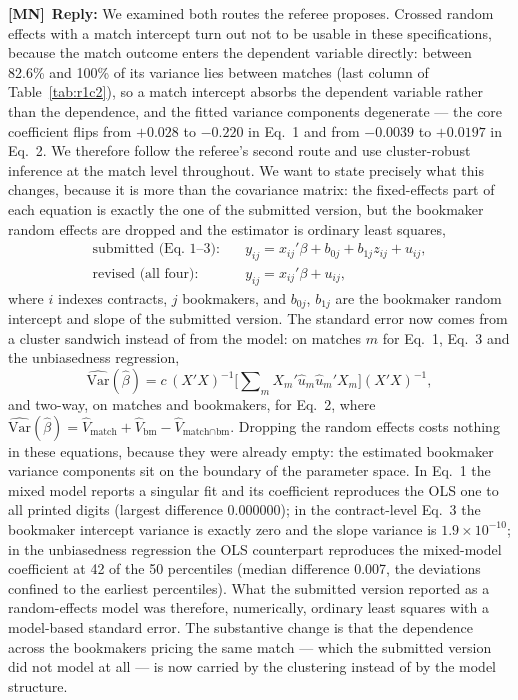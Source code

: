 \documentclass[letterpaper,12pt]{article}
\newcounter{b}
\newcommand{\ReplyMN}[1]{\par\noindent%
  \textcolor{mncol}{\textbf{[MN]}}~\textbf{Reply:} #1}
\begin{document}
\begin{enumerate}
\ReplyMN{We examined both routes the referee proposes. Crossed random effects with a match intercept turn out not to be usable in these specifications, because the match outcome enters the dependent variable directly: between 82.6\% and 100\% of its variance lies between matches (last column of Table~\ref{tab:r1c2}), so a match intercept absorbs the dependent variable rather than the dependence, and the fitted variance components degenerate --- the core coefficient flips from $+0.028$ to $-0.220$ in Eq.~1 and from $-0.0039$ to $+0.0197$ in Eq.~2. We therefore follow the referee's second route and use cluster-robust inference at the match level throughout. We want to state precisely what this changes, because it is more than the covariance matrix: the fixed-effects part of each equation is exactly the one of the submitted version, but the bookmaker random effects are dropped and the estimator is ordinary least squares,
\begin{align*}
\text{submitted (Eq.~1--3):} \quad & y_{ij} = x_{ij}' \beta + b_{0j} + b_{1j} z_{ij} + u_{ij}, \\
\text{revised (all four):} \quad & y_{ij} = x_{ij}' \beta + u_{ij},
\end{align*}
where $i$ indexes contracts, $j$ bookmakers, and $b_{0j}$, $b_{1j}$ are the bookmaker random intercept and slope of the submitted version. The standard error now comes from a cluster sandwich instead of from the model: on matches $m$ for Eq.~1, Eq.~3 and the unbiasedness regression,
\begin{equation*}
\widehat{\mathrm{Var}}(\hat{\beta}) = c \, (X'X)^{-1}
\Big[ \sum\nolimits_{m} X_m' \hat{u}_m \hat{u}_m' X_m \Big] (X'X)^{-1},
\end{equation*}
and two-way, on matches and bookmakers, for Eq.~2, where $\widehat{\mathrm{Var}}(\hat{\beta}) = \hat{V}_{\text{match}} + \hat{V}_{\text{bm}} - \hat{V}_{\text{match} \cap \text{bm}}$. Dropping the random effects costs nothing in these equations, because they were already empty: the estimated bookmaker variance components sit on the boundary of the parameter space. In Eq.~1 the mixed model reports a singular fit and its coefficient reproduces the OLS one to all printed digits (largest difference $0.000000$); in the contract-level Eq.~3 the bookmaker intercept variance is exactly zero and the slope variance is $1.9 \times 10^{-10}$; in the unbiasedness regression the OLS counterpart reproduces the mixed-model coefficient at 42 of the 50 percentiles (median difference 0.007, the deviations confined to the earliest percentiles). What the submitted version reported as a random-effects model was therefore, numerically, ordinary least squares with a model-based standard error. The substantive change is that the dependence across the bookmakers pricing the same match --- which the submitted version did not model at all --- is now carried by the clustering instead of by the model structure.

}
\end{enumerate}
\end{document}
